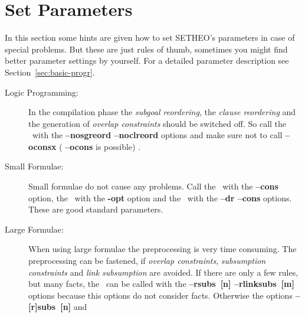 %

\section{Set Parameters}

In this section some hints are given how to set SETHEO's parameters in
case of special problems. But these are just rules of thumb, sometimes
you might find better parameter settings by yourself. For a detailed
parameter description see Section~\ref{sec:basic-progr}.

\begin{description}
\item[Logic Programming:]
     {In the compilation phase the {\it subgoal reordering\/},
      the {\it clause reordering\/} and the generation of {\it
      overlap constraints\/} should be switched off. 
      So call the \inw\ with the {\bf --nosgreord --noclreord}
      options and make sure not to call {\bf --oconsx} ({\bf
      --ocons} is possible) 
      }.
\item[Small Formulae:]
     {Small formulae do not cause any problems. Call the \inw\ with
      the {\bf --cons} option, the \wasm\ with the {\bf -opt}
      option and the \sam\ with the {\bf --dr --cons} options. These
      are good standard parameters.} 
\item[Large Formulae:]
     {When using large formulae the preprocessing is very time
      consuming. The 
      preprocessing can be fastened, if {\it overlap constraints\/},
      {\it subsumption constraints\/} and {\it link subsumption\/} are
      avoided. If there are only a few rules, but many facts, the \inw\
      can be called with the {\bf --rsubs~[n] --rlinksubs~[m]}
      options because this options do not consider facts. Otherwise
      the options {\bf --[r]subs~[n]} and {\bf 
}}
\end{description}
